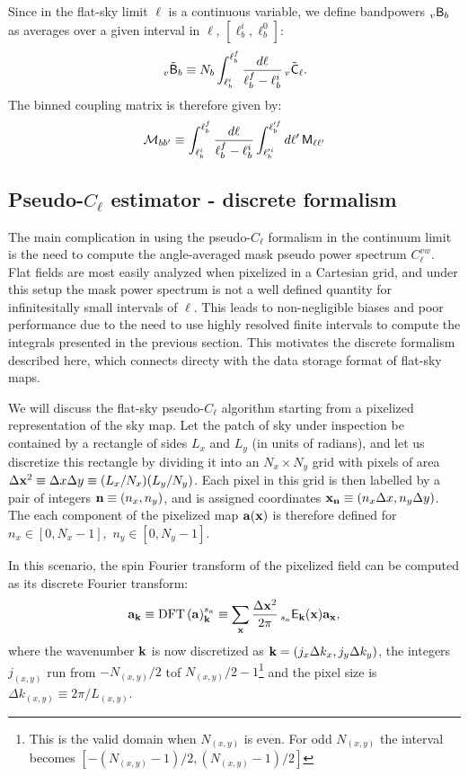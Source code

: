 \documentclass[a4paper,10pt]{article}
\begin{document}
    Since in the flat-sky limit $\ell$ is a continuous variable, we define bandpowers $_v{\sf B}_b$ as averages over a given interval in $\ell$, $[\ell_b^i,\ell_b^0]$:
    \begin{equation}
      \,_v\tilde{\sf B}_b\equiv N_b\int_{\ell_b^i}^{\ell_b^f} \frac{d\ell}{\ell_b^f-\ell_b^i}\,_v\tilde{\sf C}_\ell.
    \end{equation}
    The binned coupling matrix is therefore given by:
    \begin{equation}
      \mathcal{M}_{bb'}\equiv\int^{\ell_b^f}_{\ell_b^i} \frac{d\ell}{\ell_b^f-\ell_b^i}\int^{\ell_b'^f}_{\ell_b'^i} d\ell'\,{\sf M}_{\ell\ell'}
    \end{equation}

  \subsection{Pseudo-$C_\ell$ estimator - discrete formalism}
    The main complication in using the pseudo-$C_\ell$ formalism in the continuum limit is the need to compute the angle-averaged mask pseudo power spectrum $C^{vw}_\ell$. Flat fields are most easily analyzed when pixelized in a Cartesian grid, and under this setup the mask power spectrum is not a well defined quantity for infinitesitally small intervals of $\ell$. This leads to non-negligible biases and poor performance \cite{2016arXiv161204664A} due to the need to use highly resolved finite intervals to compute the integrals presented in the previous section. This motivates the discrete formalism described here, which connects directy with the data storage format of flat-sky maps.
  
    We will discuss the flat-sky pseudo-$C_\ell$ algorithm starting from a pixelized representation of the sky map.
    Let the patch of sky under inspection be contained by a rectangle of sides $L_x$ and $L_y$ (in units of radians),
    and let us discretize this rectangle by dividing it into an $N_x\times N_y$ grid with pixels of area
    $\Delta{\bf x}^2\equiv\Delta x\Delta y\equiv (L_x/N_x)(L_y/N_y)$. Each pixel in this grid is then labelled by a
    pair of integers ${\bf n}\equiv(n_x,n_y)$, and is assigned coordinates ${\bf x}_{\bf n}\equiv(n_x\Delta x,n_y\Delta y)$.
    The each component of the pixelized map ${\bf a}({\bf x})$ is therefore defined for
    $n_x\in[0,N_x-1],\,\,n_y\in[0,N_y-1]$.
    
    In this scenario, the spin Fourier transform of the pixelized field can be computed as its discrete Fourier transform:
    \begin{equation}
      {\bf a}_{\bf k}\equiv {\rm DFT}\left({\bf a}\right)^{s_a}_{\bf k}\equiv\sum_{\bf x}\frac{\Delta{\bf x}^2}{2\pi}\,_{s_a}{\sf E}_{\bf k}({\bf x}){\bf a}_{\bf x},
    \end{equation}
    where the wavenumber ${\bf k}$ is now discretized as ${\bf k}=(j_x\Delta k_x,j_y\Delta k_y)$, the integers
    $j_{(x,y)}$ run from $-N_{(x,y)}/2$ tof $N_{(x,y)}/2-1$\footnote{This is the valid domain when $N_{(x,y)}$ is even.
    For odd $N_{(x,y)}$ the interval becomes $[-(N_{(x,y)}-1)/2,(N_{(x,y)}-1)/2]$} and the pixel size is
    $\Delta k_{(x,y)}\equiv2\pi/L_{(x,y)}$.
    
\end{document}
